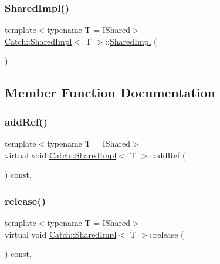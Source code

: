 \subsubsection{\texorpdfstring{Shared\+Impl()}{SharedImpl()}}
{\footnotesize\ttfamily template$<$typename T = I\+Shared$>$ \\
\mbox{\hyperlink{struct_catch_1_1_shared_impl}{Catch\+::\+Shared\+Impl}}$<$ T $>$\+::\mbox{\hyperlink{struct_catch_1_1_shared_impl}{Shared\+Impl}} (\begin{DoxyParamCaption}{ }\end{DoxyParamCaption})\hspace{0.3cm}{\ttfamily [inline]}}



\subsection{Member Function Documentation}
\mbox{\label{struct_catch_1_1_shared_impl_a5d1a4c96e8fc07c821890fd09749062e}} 
\subsubsection{\texorpdfstring{add\+Ref()}{addRef()}}
{\footnotesize\ttfamily template$<$typename T = I\+Shared$>$ \\
virtual void \mbox{\hyperlink{struct_catch_1_1_shared_impl}{Catch\+::\+Shared\+Impl}}$<$ T $>$\+::add\+Ref (\begin{DoxyParamCaption}{ }\end{DoxyParamCaption}) const\hspace{0.3cm}{\ttfamily [inline]}, {\ttfamily [virtual]}}

\mbox{\label{struct_catch_1_1_shared_impl_ada8052c6f24fd73ec099333626f106fe}} 
\subsubsection{\texorpdfstring{release()}{release()}}
{\footnotesize\ttfamily template$<$typename T = I\+Shared$>$ \\
virtual void \mbox{\hyperlink{struct_catch_1_1_shared_impl}{Catch\+::\+Shared\+Impl}}$<$ T $>$\+::release (\begin{DoxyParamCaption}{ }\end{DoxyParamCaption}) const\hspace{0.3cm}{\ttfamily [inline]}, {\ttfamily [virtual]}}



